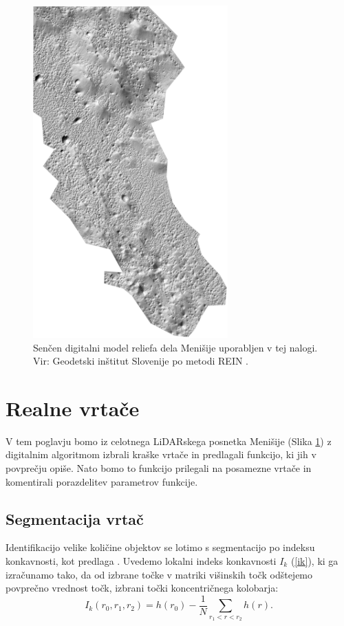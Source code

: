 \documentclass[a4paper, twoside, 12pt]{book}
\begin{document}
 \begin{figure}[h!]
    \begin{center}
      \includegraphics[width=7.5cm]{slike/menisija-relief}
    \end{center}
    \caption{Senčen digitalni model reliefa dela Menišije uporabljen v tej nalogi. Vir: Geodetski inštitut Slovenije \cite{LAK} po metodi REIN \cite{Kobler20079}.}
    \label{fig:menisija-relief}
  \end{figure} 

  \chapter{Realne vrtače}
  \label{realne-vrtace}

V tem poglavju bomo iz celotnega LiDARskega posnetka Menišije (Slika \ref{fig:menisija-relief}) z digitalnim algoritmom izbrali kraške vrtače in predlagali funkcijo, ki jih v povprečju opiše. Nato bomo to funkcijo prilegali na posamezne vrtače in komentirali porazdelitev parametrov funkcije.

  \section{Segmentacija vrtač}

Identifikacijo velike količine objektov se lotimo s segmentacijo po indeksu konkavnosti, kot predlaga \cite{doctor13}. Uvedemo lokalni indeks konkavnosti $I_k$ (\ref{ik}), ki ga izračunamo tako, da od izbrane točke v matriki višinskih točk odštejemo povprečno vrednost točk, izbrani točki koncentričnega kolobarja:
\begin{equation}  I_k(r_0,r_1,r_2) = h(r_0)- \frac{1}{N}\sum\limits_{r_1<r<r_2} h(r). \label{ik} \end{equation}
\end{document}
